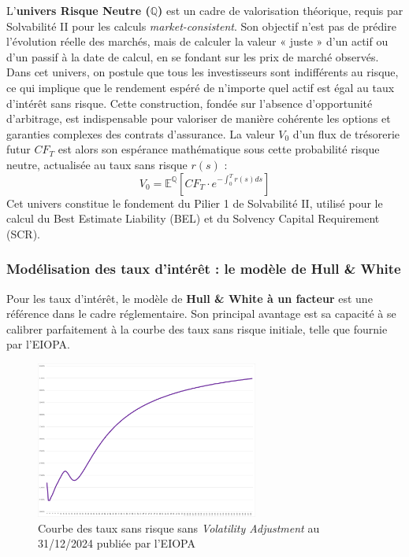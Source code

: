 L'\textbf{univers Risque Neutre ($\mathbb{Q}$)} est un cadre de valorisation théorique, requis par Solvabilité II pour les calculs \textit{market-consistent}. Son objectif n'est pas de prédire l'évolution réelle des marchés, mais de calculer la valeur « juste » d'un actif ou d'un passif à la date de calcul, en se fondant sur les prix de marché observés. Dans cet univers, on postule que tous les investisseurs sont indifférents au risque, ce qui implique que le rendement espéré de n'importe quel actif est égal au taux d'intérêt sans risque. Cette construction, fondée sur l'absence d'opportunité d'arbitrage, est indispensable pour valoriser de manière cohérente les options et garanties complexes des contrats d'assurance. La valeur $V_0$ d'un flux de trésorerie futur $CF_T$ est alors son espérance mathématique sous cette probabilité risque neutre, actualisée au taux sans risque $r(s)$ :
\begin{equation}
    V_0 = \mathbb{E}^{\mathbb{Q}} \left[ CF_T \cdot e^{-\int_0^T r(s)ds} \right]
    \label{eq:valeur_risque_neutre}
\end{equation}
Cet univers constitue le fondement du Pilier 1 de Solvabilité II, utilisé pour le calcul du Best Estimate Liability (BEL) et du Solvency Capital Requirement (SCR).

\subsubsection{Modélisation des taux d'intérêt : le modèle de Hull \& White}
Pour les taux d'intérêt, le modèle de \textbf{Hull \& White à un facteur} est une référence dans le cadre réglementaire. Son principal avantage est sa capacité à se calibrer parfaitement à la courbe des taux sans risque initiale, telle que fournie par l'EIOPA.
\begin{figure}[H]
    \centering
    \includegraphics[width=0.65\textwidth]{images/2_chapitres/chapitre1/courbe_EIOPA.png}
    \caption{Courbe des taux sans risque sans \textit{Volatility Adjustment} au 31/12/2024 publiée par l'EIOPA}
    \label{fig:courbe_EIOPA}
\end{figure}

